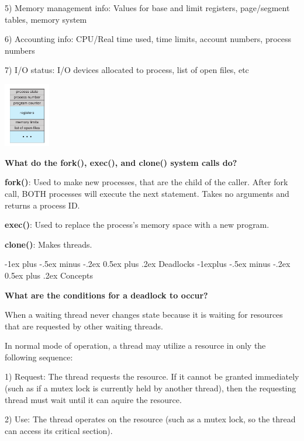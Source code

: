 \documentclass[8pt,landscape]{article}
\makeatletter
\renewcommand{\section}{\@startsection{section}{1}{0mm}%
                                {-1ex plus -.5ex minus -.2ex}%
                                {0.5ex plus .2ex}%
                                {\normalfont\footnotesize\bfseries}}
\renewcommand{\subsection}{\@startsection{subsection}{2}{0mm}%
                                {-1explus -.5ex minus -.2ex}%
                                {0.5ex plus .2ex}%
                                {\normalfont\scriptsize\bfseries}}
\makeatother
\begin{document}
\begin{multicols}{3}
\begin{tiny}
5) Memory management info: Values for base and limit registers, page/segment tables, memory system

6) Accounting info: CPU/Real time used, time limits, account numbers, process numbers

7) I/O status: I/O devices allocated to process, list of open files, etc

\begingroup
	\centering
	\includegraphics[width=2cm]{PCB.png}
	\label{fig:b}
\endgroup

\textbf{What do the fork(), exec(), and clone() system calls do?}

\textbf{fork()}: Used to make new processes, that are the child of the caller. 
After fork call, BOTH processes will execute the next statement. Takes no arguments and 
returns a process ID.

\textbf{exec()}: Used to replace the process's memory space with a new program.

\textbf{clone()}: Makes threads.

\section{Deadlocks}
\subsection{Concepts}

\textbf{What are the conditions for a deadlock to occur?}

When a waiting thread never changes state because it is waiting for resources that are requested by other 
waiting threads.

In normal mode of operation, a thread may utilize a resource in only the following sequence:

1) Request: The thread requests the resource. If it cannot be granted immediately (such as if a mutex lock
is currently held by another thread), then the requesting thread must wait until it can aquire the resource.

2) Use: The thread operates on the resource (such as a mutex lock, so the thread can access its 
critical 
section).


\end{tiny}
\end{multicols}
\end{document}
